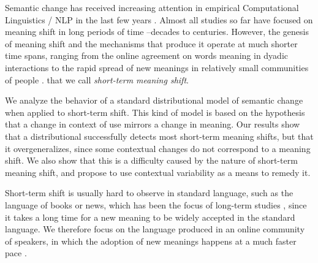 Semantic change has received increasing attention in empirical Computational Linguistics / NLP in the last few years \cite{tang2018state}. Almost all studies so far have focused on meaning shift in long periods of time --decades to centuries. However, the genesis of meaning shift and the mechanisms that produce it operate at much shorter time spans, ranging
from the online agreement on words meaning in dyadic interactions \cite{brennan1996conceptual} to the rapid spread of new meanings in relatively small communities of people \cite{del2017semantic,del2018road}.  that we call \textit{short-term meaning shift}.

We  analyze the
 behavior of a standard distributional model of semantic change when
 applied to short-term shift.
This kind of model is based on the hypothesis that a change in context of use mirrors a change in meaning.
Our results show that a distributional successfully detects most short-term meaning shifts, but that it overgeneralizes, since some contextual changes do not correspond to a meaning shift.
We also show that this is a difficulty caused by the nature of short-term meaning shift, and propose to use contextual variability as a means to remedy it.


Short-term shift is usually hard to observe in standard language, such
as the language of books or news, which has been the focus of
long-term studies \cite{hamilton2016diachronic,kulkarni2015statistically}, since
it takes a long time for a new meaning to be widely accepted in the standard language. 
We therefore focus on the language produced in an online community of speakers, in which the 
adoption of new meanings happens at a much faster pace \cite{Clark96,hasan2009}.

